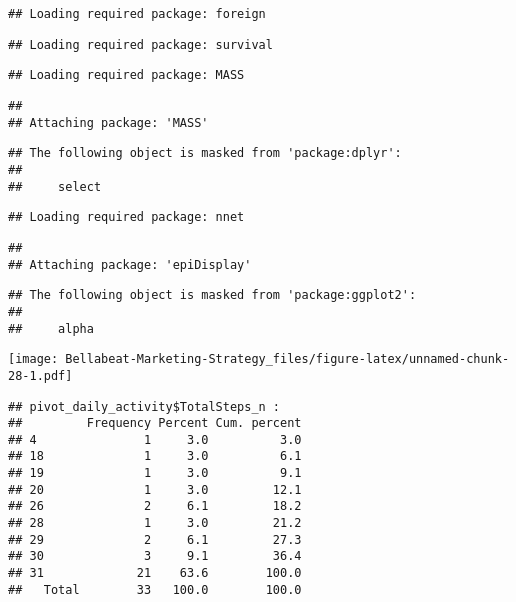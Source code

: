 \documentclass[
]{article}
\newenvironment{Shaded}{\begin{snugshade}}{\end{snugshade}}
\newcommand{\AttributeTok}[1]{\textcolor[rgb]{0.77,0.63,0.00}{#1}}
\newcommand{\ConstantTok}[1]{\textcolor[rgb]{0.00,0.00,0.00}{#1}}
\newcommand{\FunctionTok}[1]{\textcolor[rgb]{0.00,0.00,0.00}{#1}}
\newcommand{\NormalTok}[1]{#1}
\newcommand{\SpecialCharTok}[1]{\textcolor[rgb]{0.00,0.00,0.00}{#1}}
\newcommand{\StringTok}[1]{\textcolor[rgb]{0.31,0.60,0.02}{#1}}
\begin{document}
\begin{verbatim}
## Loading required package: foreign
\end{verbatim}

\begin{verbatim}
## Loading required package: survival
\end{verbatim}

\begin{verbatim}
## Loading required package: MASS
\end{verbatim}

\begin{verbatim}
## 
## Attaching package: 'MASS'
\end{verbatim}

\begin{verbatim}
## The following object is masked from 'package:dplyr':
## 
##     select
\end{verbatim}

\begin{verbatim}
## Loading required package: nnet
\end{verbatim}

\begin{verbatim}
## 
## Attaching package: 'epiDisplay'
\end{verbatim}

\begin{verbatim}
## The following object is masked from 'package:ggplot2':
## 
##     alpha
\end{verbatim}

\begin{Shaded}
\end{Shaded}

\texttt{[image: Bellabeat-Marketing-Strategy\_files/figure-latex/unnamed-chunk-28-1.pdf]}

\begin{verbatim}
## pivot_daily_activity$TotalSteps_n : 
##         Frequency Percent Cum. percent
## 4               1     3.0          3.0
## 18              1     3.0          6.1
## 19              1     3.0          9.1
## 20              1     3.0         12.1
## 26              2     6.1         18.2
## 28              1     3.0         21.2
## 29              2     6.1         27.3
## 30              3     9.1         36.4
## 31             21    63.6        100.0
##   Total        33   100.0        100.0
\end{verbatim}
\end{document}
